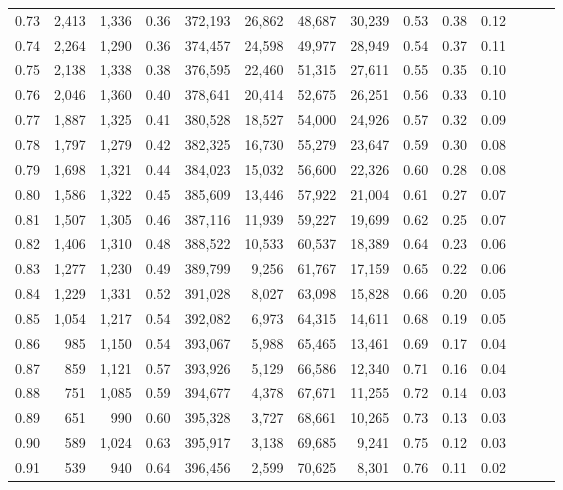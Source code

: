 \begin{tabular}{rrrrrrrrrrrrrr}
0.73 &  2,413 &  1,336 &  0.36 &  372,193 &   26,862 &  48,687 &  30,239 &  0.53 &  0.38 &      0.12 \\
0.74 &  2,264 &  1,290 &  0.36 &  374,457 &   24,598 &  49,977 &  28,949 &  0.54 &  0.37 &      0.11 \\
0.75 &  2,138 &  1,338 &  0.38 &  376,595 &   22,460 &  51,315 &  27,611 &  0.55 &  0.35 &      0.10 \\
0.76 &  2,046 &  1,360 &  0.40 &  378,641 &   20,414 &  52,675 &  26,251 &  0.56 &  0.33 &      0.10 \\
0.77 &  1,887 &  1,325 &  0.41 &  380,528 &   18,527 &  54,000 &  24,926 &  0.57 &  0.32 &      0.09 \\
0.78 &  1,797 &  1,279 &  0.42 &  382,325 &   16,730 &  55,279 &  23,647 &  0.59 &  0.30 &      0.08 \\
0.79 &  1,698 &  1,321 &  0.44 &  384,023 &   15,032 &  56,600 &  22,326 &  0.60 &  0.28 &      0.08 \\
0.80 &  1,586 &  1,322 &  0.45 &  385,609 &   13,446 &  57,922 &  21,004 &  0.61 &  0.27 &      0.07 \\
0.81 &  1,507 &  1,305 &  0.46 &  387,116 &   11,939 &  59,227 &  19,699 &  0.62 &  0.25 &      0.07 \\
0.82 &  1,406 &  1,310 &  0.48 &  388,522 &   10,533 &  60,537 &  18,389 &  0.64 &  0.23 &      0.06 \\
0.83 &  1,277 &  1,230 &  0.49 &  389,799 &    9,256 &  61,767 &  17,159 &  0.65 &  0.22 &      0.06 \\
0.84 &  1,229 &  1,331 &  0.52 &  391,028 &    8,027 &  63,098 &  15,828 &  0.66 &  0.20 &      0.05 \\
0.85 &  1,054 &  1,217 &  0.54 &  392,082 &    6,973 &  64,315 &  14,611 &  0.68 &  0.19 &      0.05 \\
0.86 &    985 &  1,150 &  0.54 &  393,067 &    5,988 &  65,465 &  13,461 &  0.69 &  0.17 &      0.04 \\
0.87 &    859 &  1,121 &  0.57 &  393,926 &    5,129 &  66,586 &  12,340 &  0.71 &  0.16 &      0.04 \\
0.88 &    751 &  1,085 &  0.59 &  394,677 &    4,378 &  67,671 &  11,255 &  0.72 &  0.14 &      0.03 \\
0.89 &    651 &    990 &  0.60 &  395,328 &    3,727 &  68,661 &  10,265 &  0.73 &  0.13 &      0.03 \\
0.90 &    589 &  1,024 &  0.63 &  395,917 &    3,138 &  69,685 &   9,241 &  0.75 &  0.12 &      0.03 \\
0.91 &    539 &    940 &  0.64 &  396,456 &    2,599 &  70,625 &   8,301 &  0.76 &  0.11 &      0.02 \\

\end{tabular}
